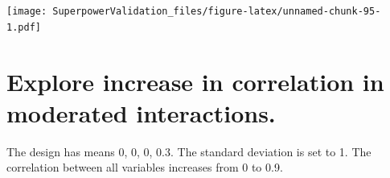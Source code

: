 \documentclass[]{book}
\newenvironment{Shaded}{\begin{snugshade}}{\end{snugshade}}
\newcommand{\DataTypeTok}[1]{\textcolor[rgb]{0.13,0.29,0.53}{#1}}
\newcommand{\FloatTok}[1]{\textcolor[rgb]{0.00,0.00,0.81}{#1}}
\newcommand{\KeywordTok}[1]{\textcolor[rgb]{0.13,0.29,0.53}{\textbf{#1}}}
\newcommand{\NormalTok}[1]{#1}
\newcommand{\OperatorTok}[1]{\textcolor[rgb]{0.81,0.36,0.00}{\textbf{#1}}}
\newcommand{\StringTok}[1]{\textcolor[rgb]{0.31,0.60,0.02}{#1}}
\begin{document}
\begin{Shaded}
\end{Shaded}

\texttt{[image: SuperpowerValidation\_files/figure-latex/unnamed-chunk-95-1.pdf]}

\hypertarget{explore-increase-in-correlation-in-moderated-interactions.}{%
\section{Explore increase in correlation in moderated interactions.}\label{explore-increase-in-correlation-in-moderated-interactions.}}

The design has means 0, 0, 0, 0.3. The standard deviation is set to 1. The correlation between all variables increases from 0 to 0.9.
\end{document}
